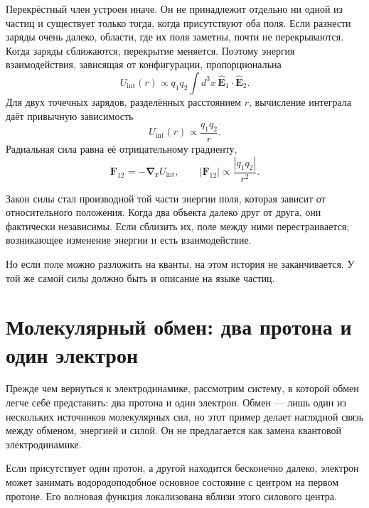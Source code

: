 Перекрёстный член устроен иначе. Он не принадлежит отдельно ни одной из частиц и существует только тогда, когда присутствуют оба поля. Если разнести заряды очень далеко, области, где их поля заметны, почти не перекрываются. Когда заряды сближаются, перекрытие меняется. Поэтому энергия взаимодействия, зависящая от конфигурации, пропорциональна
\begin{equation}
U_{\text{int}}(r)\propto q_1q_2\int d^3x\,
\widehat{\mathbf E}_1\!\cdot\!\widehat{\mathbf E}_2.
\end{equation}
Для двух точечных зарядов, разделённых расстоянием \(r\), вычисление интеграла даёт привычную зависимость
\begin{equation}
U_{\text{int}}(r)\propto\frac{q_1q_2}{r}.
\end{equation}
Радиальная сила равна её отрицательному градиенту,
\begin{equation}
\mathbf F_{12}=-\boldsymbol\nabla_{\mathbf r}U_{\text{int}},
\qquad
|\mathbf F_{12}|\propto\frac{|q_1q_2|}{r^2}.
\end{equation}

Закон силы стал производной той части энергии поля, которая зависит от относительного положения. Когда два объекта далеко друг от друга, они фактически независимы. Если сблизить их, поле между ними перестраивается; возникающее изменение энергии и есть взаимодействие.

Но если поле можно разложить на кванты, на этом история не заканчивается. У той же самой силы должно быть и описание на языке частиц.

\section{Молекулярный обмен: два протона и один электрон}

Прежде чем вернуться к электродинамике, рассмотрим систему, в которой обмен легче себе представить: два протона и один электрон. Обмен — лишь один из нескольких источников молекулярных сил, но этот пример делает наглядной связь между обменом, энергией и силой. Он не предлагается как замена квантовой электродинамике.

Если присутствует один протон, а другой находится бесконечно далеко, электрон может занимать водородоподобное основное состояние с центром на первом протоне. Его волновая функция локализована вблизи этого силового центра.

